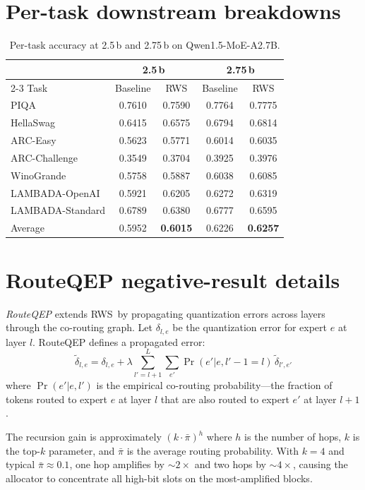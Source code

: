 \documentclass{article}
\newcommand{\method}{\textsc{RWS}\xspace}
\begin{document}
\section{Per-task downstream breakdowns}
\label{app:per-task}

\begin{table}[ht]
\centering
\small
\caption{Per-task accuracy at 2.5\,b and 2.75\,b on Qwen1.5-MoE-A2.7B.}
\begin{tabular}{lcccc}
\toprule
& \multicolumn{2}{c}{2.5\,b} & \multicolumn{2}{c}{2.75\,b} \\
\cmidrule{2-3}\cmidrule{4-5}
Task & Baseline & \method & Baseline & \method \\
\midrule
PIQA & 0.7610 & 0.7590 & 0.7764 & 0.7775 \\
HellaSwag & 0.6415 & 0.6575 & 0.6794 & 0.6814 \\
ARC-Easy & 0.5623 & 0.5771 & 0.6014 & 0.6035 \\
ARC-Challenge & 0.3549 & 0.3704 & 0.3925 & 0.3976 \\
WinoGrande & 0.5758 & 0.5887 & 0.6038 & 0.6085 \\
LAMBADA-OpenAI & 0.5921 & 0.6205 & 0.6272 & 0.6319 \\
LAMBADA-Standard & 0.6789 & 0.6380 & 0.6777 & 0.6595 \\
\midrule
Average & 0.5952 & \textbf{0.6015} & 0.6226 & \textbf{0.6257} \\
\bottomrule
\end{tabular}
\end{table}

\section{RouteQEP negative-result details}
\label{app:routeqep}

\emph{RouteQEP} extends \method\ by propagating quantization errors across layers through the co-routing graph. Let $\delta_{l,e}$ be the quantization error for expert $e$ at layer $l$. RouteQEP defines a propagated error:
\begin{equation}
\tilde{\delta}_{l,e} = \delta_{l,e} + \lambda \sum_{l'=l+1}^{L} \sum_{e'} \Pr(e' | e, l'{-}1{=}l)\, \tilde{\delta}_{l',e'}
\end{equation}
where $\Pr(e' | e, l')$ is the empirical co-routing probability---the fraction of tokens routed to expert $e$ at layer $l$ that are also routed to expert $e'$ at layer $l+1$.

The recursion gain is approximately $(k \cdot \bar\pi)^h$ where $h$ is the number of hops, $k$ is the top-$k$ parameter, and $\bar\pi$ is the average routing probability. With $k{=}4$ and typical $\bar\pi \approx 0.1$, one hop amplifies by $\sim 2\times$ and two hops by $\sim 4\times$, causing the allocator to concentrate all high-bit slots on the most-amplified blocks.
\end{document}
